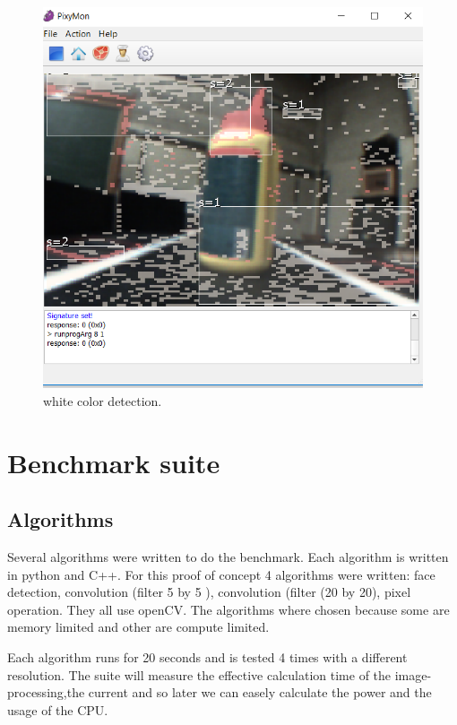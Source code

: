 \documentclass[english]{book_template} %
\begin{document}
\begin{figure}[H]
\center
\caption{white color detection.\label{fig:whitecolor}}
\includegraphics[scale=0.5]{./img/whitecolor}
\end{figure} 









 
\chapter{Benchmark suite}


\section{Algorithms}
Several algorithms were written to do the benchmark. Each algorithm is written in python and C++. For this proof of concept 4 algorithms were written: face detection,  convolution (filter 5 by 5 ), convolution (filter (20 by 20), pixel operation. They all use openCV. The algorithms where chosen because some are memory limited and other are compute limited. 



Each algorithm runs for 20 seconds and is tested 4 times with a different resolution. The suite will measure the effective calculation time of the image-processing,the current and so later we can easely calculate the power and the usage of the CPU.
\end{document}
